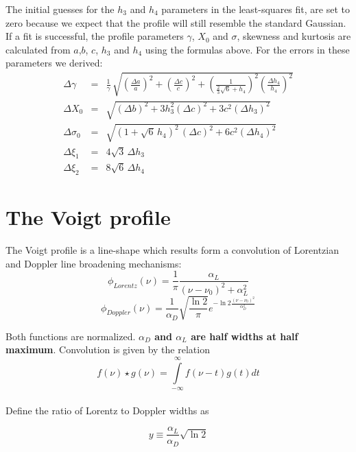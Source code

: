\documentclass[10pt,a4paper]{report}
\begin{document}
\begin{flushleft}
The initial guesses for the $h_3$ and $h_4$ parameters in the least-squares
fit, are set to zero because we expect that the profile will still resemble
the standard Gaussian. If a fit is successful,
the profile parameters $\gamma$, $X_0$ and $\sigma$, skewness and
kurtosis are calculated from
$a$,$b$, $c$, $h_3$ and $h_4$ using the formulas above.
For the errors in these parameters we derived:
\begin{eqnarray}
\Delta \gamma &=& \frac{1}{\gamma}\, 
\sqrt{{\left(\frac{\Delta a}{a}\right)}^2+
      {\left(\frac{\Delta c}{c}\right)}^2+ 
      {\left(\frac{1}{\frac{2}{3}\sqrt{6}+h_4}\right) }^2 
      {\left(\frac{\Delta h_4}{h_4}\right)}^2 }\\
\Delta X_0 &=& 
\sqrt{ {(\Delta b)}^2 + 3h_3^2{(\Delta c)}^2 +
       3c^2 {(\Delta h_3)}^2 }\\
\Delta \sigma_0 &=& 
\sqrt{{(1+\sqrt{6}\,h_4)}^2\, {(\Delta c)}^2 + 6c^2{(\Delta h_4)}^2  }\\
\Delta \xi_1 &=&  4\sqrt{3}\,\Delta h_3\\
\Delta \xi_2 &=&  8\sqrt{6}\,\Delta h_4
\end{eqnarray}



\chapter{The Voigt profile} 

The Voigt profile is a line-shape which results form a convolution of Lorentzian and Doppler line broadening mechanisms:
\begin{equation}
 \phi_{Lorentz}(\nu)=\frac{1}{\pi} \frac{\alpha_L}{(\nu-\nu_0)^2 + \alpha_L^2}
\end{equation} 
\begin{equation} 
 \phi_{Doppler}(\nu)=\frac{1}{\alpha_D} \sqrt{\frac{\ln{2}}{\pi}} e^{-\ln{2} \frac{(\nu-\nu_0)^2}{\alpha_D^2}}
\end{equation}

Both functions are normalized. {\bf $\alpha_D$ and $\alpha_L$ are half widths
at half maximum}.
Convolution is given by the relation 
$$ f(\nu) \star g(\nu)=\int\limits_{-\infty}^\infty {f(\nu - t ) g(t) dt} $$\\
Define the ratio of Lorentz to Doppler widths as 

\begin{equation}
 \label{eq:y}
 y \equiv \frac{\alpha_L}{\alpha_D} \sqrt{\ln{2}}
\end{equation} 


\end{flushleft}
\end{document}
